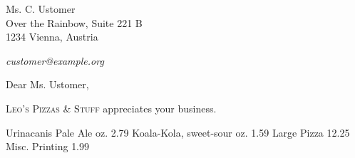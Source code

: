 \documentclass[	backaddress=off,
				paper=letter,
				fontsize=11pt,
				parskip=full]{scrlttr2}
\begin{document}
	\def\payperiod		{14}	%
					\def\invoicenumber	{42}	%
	\begin{letter}{%
%
					Ms. C. Ustomer\\
					Over the Rainbow, Suite 221\kern 1pt B\\
					1234 Vienna, Austria\\				
					\vspace{.25em}\par		%
					 \hfill\emph{customer@example.org}
	}
		\opening{Dear Ms. Ustomer,}

		\textsc{Leo's Pizzas \& Stuff} appreciates your business.%

		\begin{invoice}[N]				%
			\NumbersOff					%
			\SeparatorOff
			\UseDollar

\makeatletter
	\renewcommand*\@amount		{~}					%
	\renewcommand*\@description	{Description}		%
	\renewcommand*\@unitprice	{Unit price}		%
	\renewcommand*\@totalprice	{Total price}		%
	\renewcommand*\@decimalsep	{.}					%

	\renewcommand*\@taxabrv		{Combined Sales Tax}
	\renewcommand*\@sumnet		{Subtotal}	%
	\renewcommand*\@sumtot		{Total}	%
	\renewcommand*\@excl		{}	%

\makeatother
	{Urinacanis Pale Ale		 oz.}	{2.79}
	{Koala-Kola, sweet-sour 	 oz.}	{1.59}
		{Large Pizza}								{12.25}
	{Misc. Printing}							{1.99}

		\end{invoice}



\end{letter}
\end{document}
